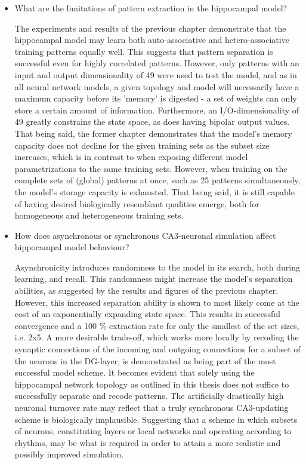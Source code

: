 \begin{itemize}
    \item What are the limitations of pattern extraction in the hippocampal model?
    
    The experiments and results of the previous chapter demonstrate that the hippocampal model may learn both auto-associative and hetero-associative training patterns equally well. This suggests that pattern separation is successful even for highly correlated patterns. However, only patterns with an input and output dimensionality of 49 were used to test the model, and as in all neural network models, a given topology and model will necessarily have a maximum capacity before its 'memory' is digested - a set of weights can only store a certain amount of information. Furthermore, an I/O-dimensionality of 49 greatly constrains the state space, as does having bipolar output values. That being said, the former chapter demonstrates that the model's memory capacity does not decline for the given training sets as the subset size increases, which is in contrast to when exposing different model parametrizations to the same training sets. However, when training on the complete sets of (global) patterns at once, such as 25 patterns simultaneously, the model's storage capacity is exhausted.
    That being said, it is still capable of having desired biologically resemblant qualities emerge, both for homogeneous and heterogeneous training sets.
    
    \item How does asynchronous or synchronous CA3-neuronal simulation affect hippocampal model behaviour?
    
    Asynchronicity introduces randomness to the model in its search, both during learning, and recall. This randomness might increase the model's separation abilities, as suggested by the results and figures of the previous chapter. However, this increased separation ability is shown to most likely come at the cost of an exponentially expanding state space. This results in successful convergence and a 100 \% extraction rate for only the smallest of the set sizes, i.e. 2x5. A more desirable trade-off, which works more locally by recoding the synaptic connections of the incoming and outgoing connections for a subset of the neurons in the DG-layer, is demonstrated as being part of the most successful model scheme. It becomes evident that solely using the hippocampal network topology as outlined in this thesis does not suffice to successfully separate and recode patterns. The artificially drastically high neuronal turnover rate may reflect that a truly synchronous CA3-updating scheme is biologically implausible. Suggesting that a scheme in which subsets of neurons, constituting layers or local networks and operating according to rhythms, may be what is required in order to attain a more realistic and possibly improved simulation.
    

\end{itemize}
